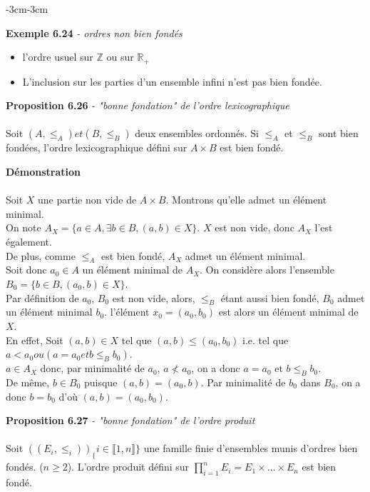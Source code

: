 \documentclass{article}
\newenvironment{exemple}[2]
{
    \begin{boite_exemple}
    \textbf{\textcolor{bleu_fonce}{Exemple #1}} \textit{#2} \\
    \begin{itemize}[label=$\blacktriangleright \quad $]                    
}
{   
    \end{itemize}
    \end{boite_exemple}
    \vspace{15pt}
}
\newenvironment{proposition}[2]
{
    \begin{boite_proposition}
    \textbf{\textcolor{rouge_fonce}{Proposition #1}} \textit{#2} \\ \\
}
{
    \end{boite_proposition}
    \vspace{15pt}
}
\newenvironment{demonstration}
{
    \begin{boite_demonstration}
    \textbf{\textcolor{rouge_fonce}{Démonstration}}\\ \\
}
{
    \end{boite_demonstration}
    \vspace{15pt}
}
\begin{document}
\begin{adjustwidth}{-3cm}{-3cm}
\begin{exemple}{6.24}{- ordres non bien fondés}
    \item l'ordre usuel sur $\mathbb{Z}$ ou sur $\mathbb{R_+}$
    \item L'inclusion sur les parties d'un ensemble infini n'est pas bien fondée.
\end{exemple}

\begin{proposition}{6.26}{- "bonne fondation" de l'ordre lexicographique}
    Soit $(A,\leq_A) et (B,\leq_B)$ deux ensembles ordonnés.
    Si $\leq_A$ et $\leq_B$ sont bien fondées, l'ordre lexicographique défini sur $A \times B$ est bien fondé.
\end{proposition}


    \begin{demonstration}
        Soit $X$ une partie non vide de $A \times B$. Montrons qu'elle admet un élément minimal.\\
        On note $A_X = \{a \in A, \exists b \in B, (a,b) \in X\}$. $X$ est non vide, donc $A_X$ l'est également.\\
        De plus, comme $\leq_A$ est bien fondé, $A_X$ admet un élément minimal.\\
        Soit donc $a_0 \in A$ un élément minimal de $A_X$. On considère alors l'ensemble $B_0 = \{b \in B, (a_0,b) \in X\}$.\\
        Par définition de $a_0$, $B_0$ est non vide, alors, $\leq_B$ étant aussi bien fondé, $B_0$ admet un élément minimal $b_0$. l'élément $x_0 = (a_0, b_0)$ est alors un élément minimal de $X$.\\
        En effet, Soit $(a,b) \in X$ tel que $(a,b) \leq (a_0,b_0)$ i.e. tel que $a < a_0 ou (a = a_0 et b \leq_B b_0)$.\\
        $a \in A_X$ donc, par minimalité de $a_0$, $a \nless a_0$, on a donc $a = a_0$ et $b \leq_B b_0$.\\
        De même, $b \in B_0$ puisque $(a,b) = (a_0,b)$. Par minimalité de $b_0$ dans $B_0$, on a donc $b = b_0$ d'où $(a,b) = (a_0,b_0)$.
    \end{demonstration}
    

    \begin{proposition}{6.27}{ - "bonne fondation" de l'ordre produit}
        Soit $((E_i,\leq_i))_\{i \in \llbracket 1,n \rrbracket \}$ une famille finie d'ensembles munis d'ordres bien fondés. ($n \geq 2$). L'ordre produit défini sur $\displaystyle \prod_{i=1}^{n}E_i = E_1 \times \ldots \times E_n$ est bien fondé.
    \end{proposition}


\end{adjustwidth}
\end{document}
